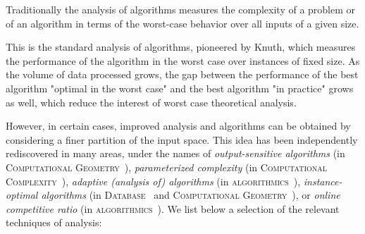 \documentclass[a4paper,10pt]{article}
\begin{document}
Traditionally the analysis of algorithms measures the complexity of a problem or of an algorithm in terms of the worst-case behavior over all inputs of a given size. \begin{LONG} This is the standard analysis of algorithms, pioneered by Knuth\cite{1968-BOOK-TheArtOfComputerProgramming-Knuth}, which measures the performance of the algorithm in the worst case over instances of fixed size. As the volume of data processed grows, the gap between the performance of the best algorithm "optimal in the worst case" and the best algorithm "in practice" grows as well, which reduce the interest of worst case theoretical analysis.

\end{LONG}
However, in certain cases, improved analysis and algorithms can be obtained by considering a finer partition of the input space.  This idea has been independently rediscovered in many areas, under the names of \emph{output-sensitive algorithms} (in \textsc{Computational Geometry}~\cite{1985-SOCG-OutputSizeSensitiveAlgorithmsForFindingMaximalVectors-KirkpatrickSeidel,1986-JCom-TheUltimatePlanarConvexHullAlgorithm-KirkpatrickSeidel}), \emph{parameterized complexity} (in \textsc{Computational Complexity}~\cite{CyganFKLMPPS15}), \emph{adaptive (analysis of) algorithms} (in \textsc{algorithmics}~\cite{1992-ACJ-AnOverviewOfAdaptiveSorting-MoffatPetersson}), \emph{instance-optimal algorithms} (in \textsc{Database}~\cite{2003-JCSS-OptimalAggregationAlgorithmsForMiddleWare-FaginLotemNaor} and \textsc{Computational Geometry}~\cite{2017-JACM-InstanceOptimalGeometricAlgorithms-AfshaniBarbayChan}), or \emph{online competitive ratio} (in \textsc{algorithmics}~\cite{2007-SODA-OnTheSeparationAndEquivalenceOfPagingStrategies-AngelopoulosDorrigivLopezOrtiz}). 
%
We list below a selection of the relevant techniques of analysis:
\end{document}
